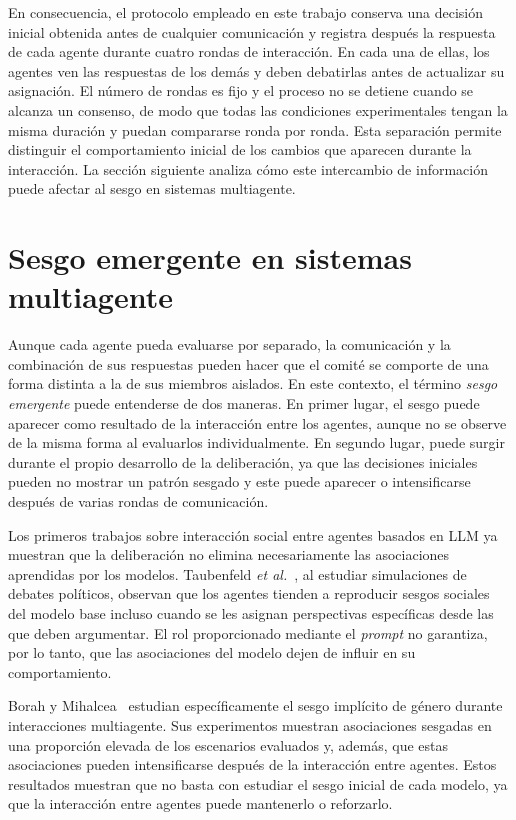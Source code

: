 En consecuencia, el protocolo empleado en este trabajo conserva una decisión inicial obtenida antes de cualquier comunicación y registra después la respuesta de cada agente durante cuatro rondas de interacción. En cada una de ellas, los agentes ven las respuestas de los demás y deben debatirlas antes de actualizar su asignación. El número de rondas es fijo y el proceso no se detiene cuando se alcanza un consenso, de modo que todas las condiciones experimentales tengan la misma duración y puedan compararse ronda por ronda. Esta separación permite distinguir el comportamiento inicial de los cambios que aparecen durante la interacción. La sección siguiente analiza cómo este intercambio de información puede afectar al sesgo en sistemas multiagente.


\section{Sesgo emergente en sistemas multiagente}
\label{sec:sesgo_mas}

Aunque cada agente pueda evaluarse por separado, la comunicación y la combinación de sus respuestas pueden hacer que el comité se comporte de una forma distinta a la de sus miembros aislados. En este contexto, el término \textit{sesgo emergente} puede entenderse de dos maneras. En primer lugar, el sesgo puede aparecer como resultado de la interacción entre los agentes, aunque no se observe de la misma forma al evaluarlos individualmente. En segundo lugar, puede surgir durante el propio desarrollo de la deliberación, ya que las decisiones iniciales pueden no mostrar un patrón sesgado y este puede aparecer o intensificarse después de varias rondas de comunicación.

Los primeros trabajos sobre interacción social entre agentes basados en LLM ya muestran que la deliberación no elimina necesariamente las asociaciones aprendidas por los modelos. Taubenfeld \textit{et al.}~\cite{taubenfeld2024systematic}, al estudiar simulaciones de debates políticos, observan que los agentes tienden a reproducir sesgos sociales del modelo base incluso cuando se les asignan perspectivas específicas desde las que deben argumentar. El rol proporcionado mediante el \textit{prompt} no garantiza, por lo tanto, que las asociaciones del modelo dejen de influir en su comportamiento.

Borah y Mihalcea~\cite{borah2024towards} estudian específicamente el sesgo implícito de género durante interacciones multiagente. Sus experimentos muestran asociaciones sesgadas en una proporción elevada de los escenarios evaluados y, además, que estas asociaciones pueden intensificarse después de la interacción entre agentes. Estos resultados muestran que no basta con estudiar el sesgo inicial de cada modelo, ya que la interacción entre agentes puede mantenerlo o reforzarlo.

